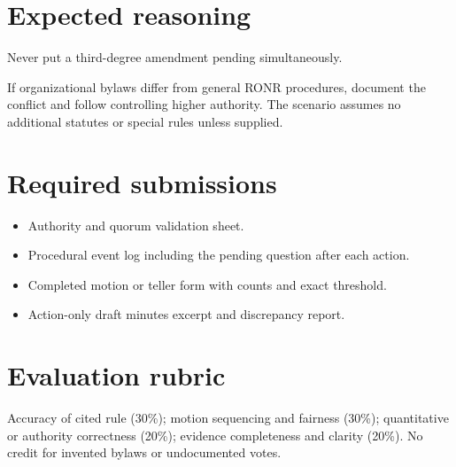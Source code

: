 \documentclass[11pt]{article}
\begin{document}
\section{Expected reasoning}
Never put a third-degree amendment pending simultaneously.

If organizational bylaws differ from general RONR procedures, document the conflict and follow controlling higher authority. The scenario assumes no additional statutes or special rules unless supplied.

\section{Required submissions}
\begin{itemize}[leftmargin=*,itemsep=4pt]
\item Authority and quorum validation sheet.
\item Procedural event log including the pending question after each action.
\item Completed motion or teller form with counts and exact threshold.
\item Action-only draft minutes excerpt and discrepancy report.
\end{itemize}

\section{Evaluation rubric}
Accuracy of cited rule (30\%); motion sequencing and fairness (30\%); quantitative or authority correctness (20\%); evidence completeness and clarity (20\%). No credit for invented bylaws or undocumented votes.
\end{document}
